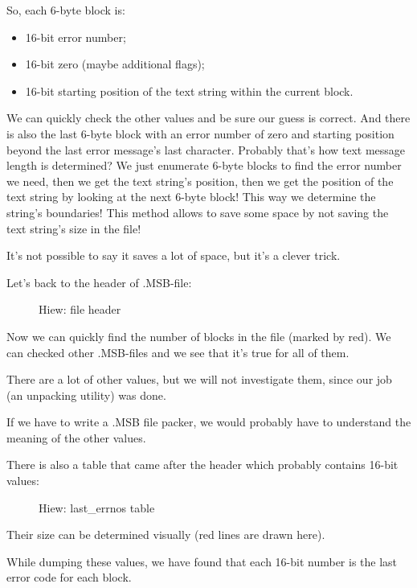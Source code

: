 So, each 6-byte block is:

\begin{itemize}
\item 16-bit error number; 
\item 16-bit zero (maybe additional flags); 
\item 16-bit starting position of 
the text string within the current block.
\end{itemize}

We can quickly check the other values and be sure our guess is correct.
And there is also the last  6-byte block 
with an error number of zero and starting position beyond the last error message's last character.
Probably that's how text message length is 
determined?
We just enumerate 6-byte blocks to find the error number
we need, then we get the text string's position, then we get the position of the text string by looking at the next
6-byte block!
This way we determine the string's boundaries!
This method allows to 
save some space by not saving the text string's size in the file!

It's not possible to say it saves a lot of space, but it's a clever trick.

\clearpage
Let's back to the header of .MSB-file:

\begin{figure}[H]
\centering
{}
\caption{Hiew: file header}
\label{fig:oracle_MSB_3}
\end{figure}

Now we can quickly find the number of blocks in the file (marked by red).
We can checked other .MSB-files and we see that it's true for all of them.

There are a lot of other values, but we will not investigate them, since our job (an unpacking utility) was done.

If we have to write a .MSB file packer, we would probably have to understand the meaning of the other values.

\clearpage
There is also a table that came after the header which probably contains 16-bit values:

\begin{figure}[H]
\centering
{}
\caption{Hiew: last\_errnos table}
\label{fig:oracle_MSB_4}
\end{figure}

Their size can be determined visually (red lines are drawn here).

While dumping these values, we have found that each 16-bit number is the last error code for each block.

